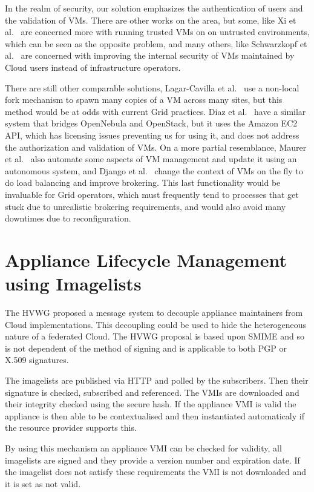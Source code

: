 \documentclass{cai}
\begin{document}
In the realm of security, our solution emphasizes the authentication of users and the validation of VMs. There are other works on the area, but some, like Xi et al.~\cite{Xi2012} are concerned more with running trusted VMs on on untrusted environments, which can be seen as the opposite problem, and many others, like Schwarzkopf et al.~\cite{Schwarzkopf2012} are concerned with improving the internal security of VMs maintained by Cloud users instead of infrastructure operators.

There are still other comparable solutions, Lagar-Cavilla et al.~\cite{Lagar-Cavilla2009} use a non-local fork mechanism to spawn many copies of a VM across many sites, but this method would be at odds with current Grid practices. 
Diaz et al.~\cite{Diaz2012} have a similar system that bridges OpenNebula and OpenStack, but it uses the Amazon EC2 API, which has licensing issues preventing us for using it, and does not address the authorization and validation of VMs. 
On a more partial resemblance, Maurer et al.~\cite{Maurer2013} also automate some aspects of VM management and update it using an autonomous system, and Django et al.~\cite{Django2013} change the context of VMs on the fly to do load balancing and improve brokering. This last functionality would be invaluable for Grid operators, which must frequently tend to processes that get stuck due to unrealistic brokering requirements, and would also avoid many downtimes due to reconfiguration.


\section{Appliance Lifecycle Management using Imagelists}
\label{sect-vmcaster}
The HVWG proposed a message system to decouple appliance maintainers from Cloud implementations. This decoupling could be used to hide the heterogeneous nature of a federated Cloud. 
The HVWG proposal is based upon SMIME and so is not dependent of the method of signing and is applicable to both PGP or X.509 signatures.

The imagelists are published via HTTP and polled by the subscribers. Then their signature is checked, subscribed and referenced. The VMIs are downloaded and their integrity checked using the secure hash. 
If the appliance VMI is valid the appliance is then able to be contextualised and then instantiated automaticaly if the resource provider supports this.

By using this mechanism an appliance VMI can be checked for validity, all imagelists are signed and they provide a version number and expiration date. 
If the imagelist does not satisfy these requirements the VMI is not downloaded and it is set as not valid.
\end{document}
